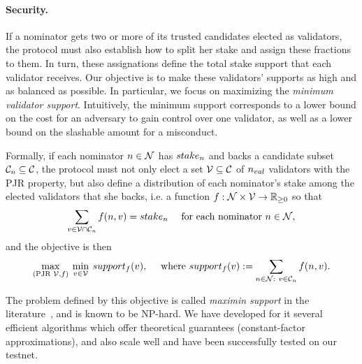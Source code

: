 \paragraph{Security.} If a nominator gets two or more of its trusted candidates elected as validators,
the protocol must also establish how to split her stake and assign these fractions to them.
In turn, these assignations define the total stake support that each validator receives.
Our objective is to make these validators' supports as high and as balanced as possible.
In particular, we focus on maximizing the \emph{minimum validator support}.
Intuitively, the minimum support corresponds to a lower bound on the cost for an adversary to gain control
over one validator, as well as a lower bound on the slashable amount for a misconduct.

Formally, if each nominator $n \in \mathcal{N}$ has $stake_{n}$ and backs a candidate subset $\mathcal{C}_{n}\subseteq \mathcal{C}$,
the protocol must not only elect a set $\mathcal{V}\subseteq \mathcal{C}$ of $n_{val}$ validators
with the PJR property, but also define a distribution of each nominator's stake among the elected validators that she backs,
i.e. a function $f:\mathcal{N}\times\mathcal{V} \rightarrow \mathbb{R}_{\geq 0}$ so that
$$\sum_{v\in \mathcal{V}\cap \mathcal{C}_{n}} f(n, v) = stake_{n} \quad \text{ for each nominator } n\in\mathcal{N},$$
and the objective is then
$$\max_{( \text{PJR } \mathcal{V}, f)} \: \min_{v\in \mathcal{V}} \: support_f(v),
\quad \text{ where } support_f(v) := \sum_{n\in \mathcal{N}: \ v\in \mathcal{C}_{n}} f(n, v). $$

The problem defined by this objective is called \emph{maximin support} in the literature~\cite{sanchez2016maximin}, and is known to be NP-hard.
We have developed for it several efficient algorithms which offer theoretical guarantees 
(constant-factor approximations), and also scale well and have been successfully tested on our testnet. 

